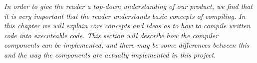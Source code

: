 \textit{In order to give the reader a top-down understanding of our product, we find that it is very important that the reader understands basic concepts of compiling. In this chapter we will explain core concepts and ideas as to how to compile written code into executeable code. This section will describe how the compiler components can be implemented, and there may be some differences between this and the way the components are actually implemented in this project.}